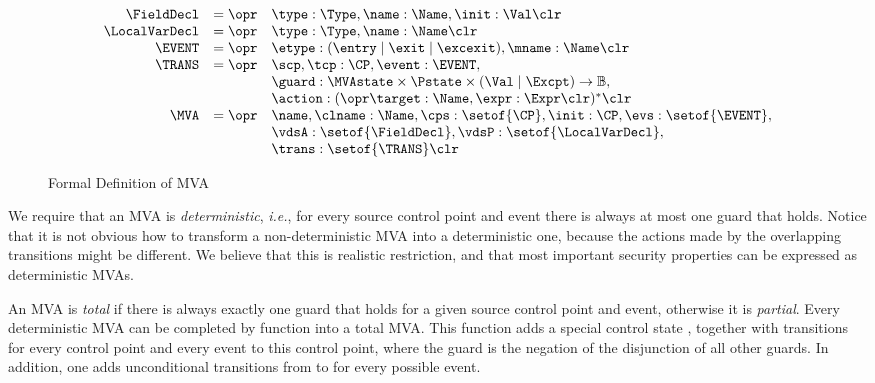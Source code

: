 \begin{figure}[t]
\[
\begin{array}{rcl}
\FieldDecl & = \opr & \type : \Type, \name : \Name, \init : \Val
\clr \\
\LocalVarDecl & = \opr & \type : \Type, \name : \Name \clr \\
\EVENT & = \opr & \etype : (\entry \mid \exit \mid \excexit),
                 \mname : \Name \clr\\
\TRANS & = \opr & \scp, \tcp : \CP, \event : \EVENT, \\
& &
\guard : \MVAstate \times \Pstate \times (\Val \mid \Excpt) \rightarrow \mathbb{B}, \\
&& \action : (\opr \target : \Name, \expr : \Expr \clr)^* \clr\\
\MVA & = \opr & \name, \clname : \Name, \cps : \setof{\CP},
            \init : \CP, \evs : \setof{\EVENT},\\
     &   &  \vdsA : \setof{\FieldDecl}, \vdsP : \setof{\LocalVarDecl},\\
     &   &  \trans : \setof{\TRANS} \clr
\end{array}
\]
\caption{Formal Definition of MVA}\label{FigMVAForm}
\end{figure}

We require that an MVA is \emph{deterministic}, \emph{i.e.}, for every
source control point and event there is always at most one guard that
holds. Notice that it is not obvious how to transform a
non-deterministic MVA into a deterministic one, because the actions
made by the overlapping transitions might be different. We believe
that this is realistic restriction, and that most important security
properties can be expressed as deterministic MVAs.

An MVA is \emph{total} if there is always exactly one guard that holds
for a given source control point and event, otherwise it is
\emph{partial}. Every deterministic MVA can be completed by function
\complete into a total
MVA. This function adds a special control state
\halted, together with transitions for every control point and every event
to this \halted control point, where the guard is the negation of the
disjunction of all other guards. In addition, one adds unconditional
transitions from \halted to \halted for every possible
event.


